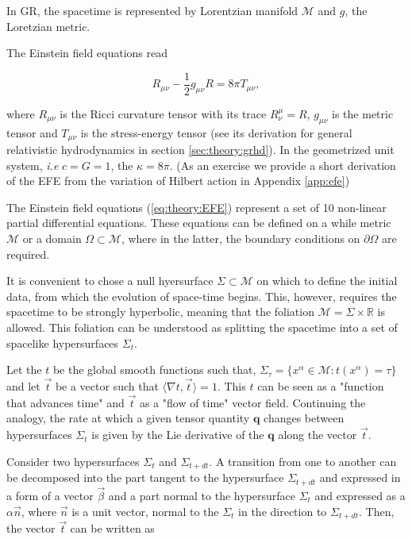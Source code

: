 \documentclass[11pt,a4paper,headinclude=true,DIV=14,BCOR=8mm,chapterprefix,listof=totoc,twoside,openright,abstracton]{scrbook}
\begin{document}
In GR, the spacetime is represented by Lorentzian manifold $\mathcal{M}$ and $g$, the Loretzian metric. 

The Einstein field equations read 

\begin{equation}
    R_{\mu\nu} -\frac{1}{2}g_{\mu\nu}R=8\pi T_{\mu\nu},
    \label{eq:theory:EFE}
\end{equation}

where $R_{\mu\nu}$ is the Ricci curvature tensor with its trace $R^{\mu}_{\nu}=R$, $g_{\mu\nu}$ is the metric tensor and $T_{\mu\nu}$ is the stress-energy tensor (see its derivation for general relativistic hydrodynamics in section \ref{sec:theory:grhd}).
In the geometrized unit system, \textit{i.e} $c=G=1$, the $\kappa=8\pi$.
(As an exercise we provide a short derivation of the EFE from the variation of Hilbert action in Appendix \ref{app:efe})


The Einstein field equations (\ref{eq:theory:EFE}) represent a set of 10 non-linear partial differential equations. These equations can be defined on a while metric $\mathcal{M}$ or a domain $\Omega\subset\mathcal{M}$, where in the latter, the boundary conditions on $\partial\Omega$ are required. 

It is convenient to chose a null hyersurface $\Sigma\subset\mathcal{M}$ on which to define the initial data, from which the evolution of space-time begins. This, however, requires the spacetime to be strongly hyperbolic, meaning that the foliation $\mathcal{M}=\Sigma\times\mathbb{R}$ is allowed. This foliation can be understood as splitting the spacetime into a set of spacelike hypersurfaces $\Sigma_t$. 


Let the $t$ be the global smooth functions such that, $\Sigma_{\tau} = \{x^{\alpha}\in\mathcal{M}: t(x^{\alpha})=\tau\}$ and let $\vec{t}$ be a vector such that $\langle\nabla t, \vec{t}\rangle = 1$. This $t$ can be seen as a "function that advances time" and $\vec{t}$ as a "flow of time" vector field. Continuing the analogy, the rate at which a given tensor quantity $\boldsymbol{q}$ changes between hypersurfaces $\Sigma_t$ is given by the Lie derivative of the $\boldsymbol{q}$ along the vector $\vec{t}$.

Consider two hypersurfaces $\Sigma_t$ and $\Sigma_{t+dt}$. A transition from one to another can be decomposed into the part tangent to the hypersurface $\Sigma_{t+dt}$ and expressed in a form of a vector $\vec{\beta}$ and a part normal to the hypersurface $\Sigma_t$ and expressed as a $\alpha \vec{n}$, where $\vec{n}$ is a unit vector, normal to the $\Sigma_t$ in the direction to $\Sigma_{t+dt}$. Then, the vector $\vec{t}$ can be written as 
\end{document}
